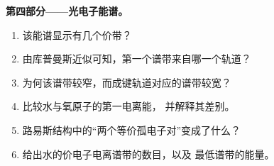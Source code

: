 \begin{problem}
\medskip
\noindent\textbf{第四部分——光电子能谱。}
\begin{enumerate}[resume]
  \item 该能谱显示有几个价带？
  \item 由库普曼斯近似可知，第一个谱带来自哪一个轨道？
  \item 为何该谱带较窄，而成键轨道对应的谱带较宽？
  \item 比较水与氧原子的第一电离能，
        并解释其差别。
  \item 路易斯结构中的“两个等价孤电子对”变成了什么？
  \item 给出水的价电子电离谱带的数目，以及
        最低谱带的能量。
\end{enumerate}
\end{problem}
